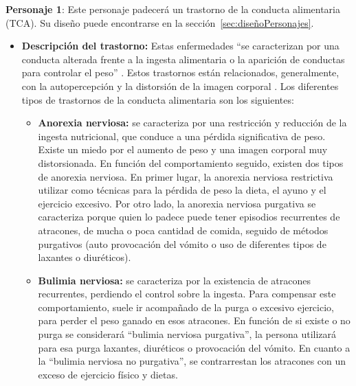 \documentclass[12pt, a4paper,twoside,titlepage]{book}
\begin{document}
\textbf{Personaje 1}: Este personaje padecerá un trastorno de la conducta alimentaria (TCA). Su diseño puede encontrarse en la sección~\ref{sec:diseñoPersonajes}.

\begin{itemize}
    \item {\textbf{Descripción del trastorno:}   Estas enfermedades ``se caracterizan por una conducta alterada frente a la ingesta alimentaria o la aparición de conductas para controlar el peso'' \cite{tcasdescripcion}. Estos trastornos están relacionados, generalmente, con la autopercepción y la distorsión de la imagen corporal \cite{tcaCM}. Los diferentes tipos de trastornos de la conducta alimentaria son los siguientes: 
        \begin{itemize}
            \item {\textbf{Anorexia nerviosa:} se caracteriza por una restricción y reducción de la ingesta nutricional, que conduce a una pérdida significativa de peso. Existe un miedo por el aumento de peso y una imagen corporal muy distorsionada. En función del comportamiento seguido, existen dos tipos de anorexia nerviosa. En primer lugar, la anorexia nerviosa restrictiva utilizar como técnicas para la pérdida de peso la dieta, el ayuno y el ejercicio excesivo. Por otro lado, la anorexia nerviosa purgativa se caracteriza porque quien lo padece puede tener episodios recurrentes de atracones, de mucha o poca cantidad de comida, seguido de métodos purgativos (auto provocación del vómito o uso de diferentes tipos de laxantes o diuréticos). }
            \item {\textbf{Bulimia nerviosa:} se caracteriza por la existencia de atracones recurrentes, perdiendo el control sobre la ingesta. Para compensar este comportamiento, suele ir acompañado de la purga o excesivo ejercicio, para perder el peso ganado en esos atracones. En función de si existe o no purga se considerará ``bulimia nerviosa purgativa'', la persona utilizará para esa purga laxantes, diuréticos o provocación del vómito. En cuanto a la “bulimia nerviosa no purgativa”, se contrarrestan los atracones con un exceso de ejercicio físico y dietas.  }
            

\end{itemize}}
\end{itemize}
\end{document}
